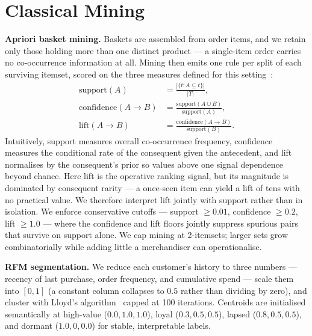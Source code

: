 \documentclass[conference]{IEEEtran}
\begin{document}

\section{Classical Mining}
\label{sec:classical}

\textbf{Apriori basket mining.} Baskets are assembled from order items, and we
retain only those holding more than one distinct product --- a single-item order
carries no co-occurrence information at all. Mining then emits one rule per split
of each surviving itemset, scored on the three measures defined for this
setting~\cite{agrawal1993mba}:
\begin{align}
\text{support}(A) &= \frac{|\{t : A \subseteq t\}|}{|T|}, \label{eq:support}\\[-1pt]
\text{confidence}(A \rightarrow B) &= \frac{\text{support}(A \cup B)}{\text{support}(A)}, \label{eq:conf}\\[-1pt]
\text{lift}(A \rightarrow B) &= \frac{\text{confidence}(A \rightarrow B)}{\text{support}(B)}.
\label{eq:lift}
\end{align}
Intuitively, support measures overall co-occurrence frequency, confidence measures
the conditional rate of the consequent given the antecedent, and lift normalises
by the consequent's prior so values above one signal dependence beyond chance.
Here lift is the operative ranking signal, but its magnitude is dominated by
consequent rarity --- a once-seen item can yield a lift of tens with no practical
value. We therefore interpret lift jointly with support rather than in isolation.
We enforce conservative cutoffs --- support $\geq 0.01$, confidence $\geq 0.2$,
lift $\geq 1.0$ --- where the confidence and lift floors jointly suppress spurious
pairs that survive on support alone. We cap mining at 2-itemsets; larger sets grow
combinatorially while adding little a merchandiser can operationalise.

\textbf{RFM segmentation.} We reduce each customer's history to three numbers ---
recency of last purchase, order frequency, and cumulative spend --- scale them into
$[0,1]$ (a constant column collapses to $0.5$ rather than dividing by zero), and
cluster with Lloyd's algorithm~\cite{lloyd1982least} capped at 100 iterations.
Centroids are initialised
semantically at high-value ($0.0,1.0,1.0$), loyal ($0.3,0.5,0.5$), lapsed
($0.8,0.5,0.5$), and dormant ($1.0,0,0.0$) for stable, interpretable labels.
\end{document}
